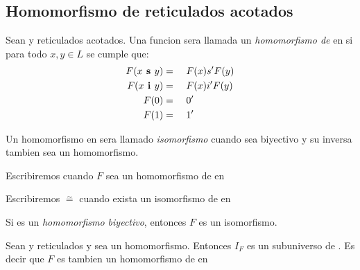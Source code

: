   \subsection{Homomorfismo de reticulados acotados}
  \begin{definition}
    Sean \reticulAcot y  reticulados acotados. Una funcion 
    sera llamada un \emph{homomorfismo de} \reticulAcot en  si para todo
    $x, y \in L$ se cumple que:
    \begin{alignat*}{4}
      F(x\textbf{ s }y) &=&\ & F(x) s' F(y)\\
      F(x\textbf{ i }y) &=&\ & F(x) i' F(y)\\
      F(0) &=&\ & 0'\\
      F(1) &=&\ & 1'
    \end{alignat*}

    Un homomorfismo \reticulAcot en  sera llamado \emph{isomorfismo} cuando
    sea biyectivo y su inversa tambien sea un homomorfismo. 

    Escribiremos  cuando $F$ sea un homomorfismo
  de \reticulAcot en 

  Escribiremos \reticulAcot $\overset{\sim}{=}$  cuando exista
  un isomorfismo de \reticulAcot en 
  \end{definition}

  \begin{lemma}
    Si  es un \emph{homomorfismo biyectivo},
    entonces $F$ es un isomorfismo.
  \end{lemma}
  \noproof
  \begin{lemma}
    Sean \reticulAcot y  reticulados y sea 
    un homomorfismo. Entonces $I_F$ es un subuniverso de . Es decir que $F$
    es tambien un homomorfismo de \reticulAcot en 
  \end{lemma}
  \noproof

